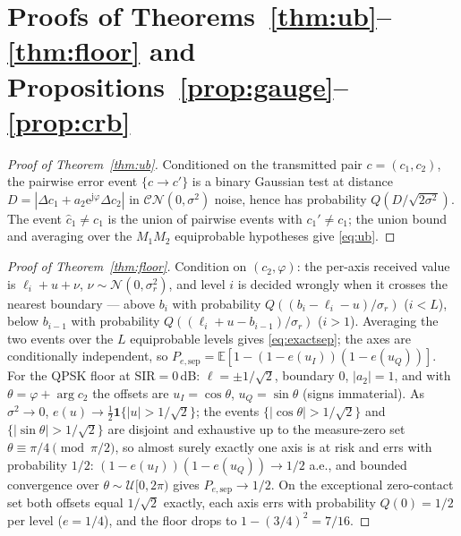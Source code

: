 \documentclass[journal]{IEEEtran}
\newcommand{\sir}{\mathrm{SIR}}
\newcommand{\ee}{\mathrm{e}}
\newcommand{\jj}{\mathrm{j}}
\newcommand{\VQ}{Q}
\begin{document}
\appendices
\scriptsize
\section{Proofs of Theorems~\ref{thm:ub}--\ref{thm:floor} and
Propositions~\ref{prop:gauge}--\ref{prop:crb}}
\label{app:proofs}

\begin{proof}[Proof of Theorem~\ref{thm:ub}]
Conditioned on the transmitted pair $c = (c_1, c_2)$, the pairwise
error event $\{c \to c'\}$ is a binary Gaussian test at distance
$D = |\Delta c_1 + a_2 \ee^{\jj\varphi} \Delta c_2|$ in
$\mathcal{CN}(0, \sigma^2)$ noise, hence has probability
$\VQ(D/\sqrt{2\sigma^2})$. The event $\hat{c}_1 \neq c_1$ is the union
of pairwise events with $c_1' \neq c_1$; the union bound and averaging
over the $M_1 M_2$ equiprobable hypotheses give \eqref{eq:ub}.
\end{proof}

\begin{proof}[Proof of Theorem~\ref{thm:floor}]
Condition on $(c_2, \varphi)$: the per-axis received value is
$\ell_i + u + \nu$, $\nu \sim \mathcal{N}(0, \sigma_r^2)$, and level
$i$ is decided wrongly when it crosses the nearest boundary --- above
$b_i$ with probability $\VQ((b_i - \ell_i - u)/\sigma_r)$ ($i < L$),
below $b_{i-1}$ with probability $\VQ((\ell_i + u - b_{i-1})/\sigma_r)$
($i > 1$). Averaging the two events over the $L$ equiprobable levels
gives \eqref{eq:exactsep}; the axes are conditionally independent, so
$P_{e,\mathrm{sep}} = \mathbb{E}[1 - (1-e(u_I))(1-e(u_Q))]$. For the
QPSK floor at $\sir = 0$\,dB: $\ell = \pm 1/\sqrt{2}$, boundary $0$,
$|a_2| = 1$, and with $\theta = \varphi + \arg c_2$ the offsets are
$u_I = \cos\theta$, $u_Q = \sin\theta$ (signs immaterial). As
$\sigma^2 \to 0$, $e(u) \to \tfrac{1}{2} \mathbf{1}\{|u| >
1/\sqrt{2}\}$; the events $\{|\cos\theta| > 1/\sqrt{2}\}$ and
$\{|\sin\theta| > 1/\sqrt{2}\}$ are disjoint and exhaustive up to the
measure-zero set $\theta \equiv \pi/4 \pmod{\pi/2}$, so almost surely
exactly one axis is at risk and errs with probability $1/2$:
$(1 - e(u_I))(1 - e(u_Q)) \to 1/2$ a.e., and bounded convergence over
$\theta \sim \mathcal{U}[0, 2\pi)$ gives $P_{e,\mathrm{sep}} \to 1/2$.
On the exceptional zero-contact set both offsets equal $1/\sqrt{2}$
exactly, each axis errs with probability $\VQ(0) = 1/2$ per level
($e = 1/4$), and the floor drops to $1 - (3/4)^2 = 7/16$.
\end{proof}
\end{document}
